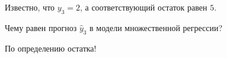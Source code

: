 
\begin{question}
Известно, что \(y_3 = 2\), а соответствующий остаток равен \(5\).

Чему равен прогноз \(\hat y_3\) в модели множественной регрессии?
\end{question}

\begin{solution}
По определению остатка!
\end{solution}

